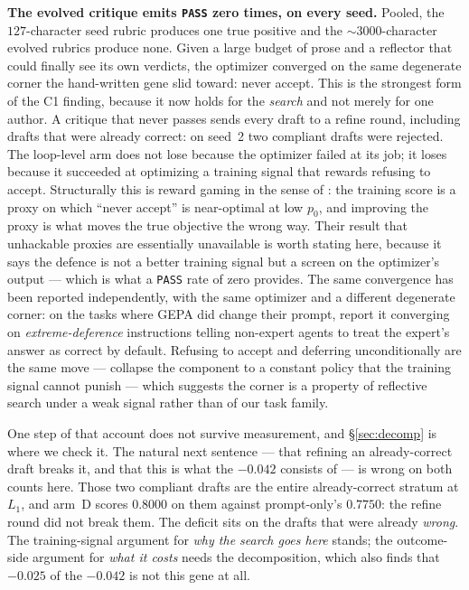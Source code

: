\documentclass[11pt]{article}
\begin{document}
\textbf{The evolved critique emits \texttt{PASS} zero times, on every seed.} Pooled, the
$127$-character seed rubric produces one true positive and the ${\sim}3000$-character evolved
rubrics produce none. Given a large budget of prose and a reflector that could finally see
its own verdicts, the optimizer converged on the same degenerate corner the hand-written gene
slid toward: never accept. This is the strongest form of the C1 finding, because it now holds
for the \emph{search} and not merely for one author. A critique that never passes sends every
draft to a refine round, including drafts that were already correct: on seed~2 two compliant
drafts were rejected. The loop-level arm does not lose because the optimizer failed at its
job; it loses because it succeeded at optimizing a training signal that rewards refusing to
accept. Structurally this is reward gaming in the sense of \citet{skalse2022reward}: the
training score is a proxy on which ``never accept'' is near-optimal at low $p_0$, and improving
the proxy is what moves the true objective the wrong way. Their result that unhackable proxies
are essentially unavailable is worth stating here, because it says the defence is not a better
training signal but a screen on the optimizer's output --- which is what a \texttt{PASS} rate of
zero provides. The same convergence has been reported independently, with the same optimizer and
a different degenerate corner: on the tasks where GEPA did change their prompt,
\citet{pappu2026multiagent} report it converging on \emph{extreme-deference} instructions telling
non-expert agents to treat the expert's answer as correct by default. Refusing to accept and
deferring unconditionally are the same move --- collapse the component to a constant policy that
the training signal cannot punish --- which suggests the corner is a property of reflective search
under a weak signal rather than of our task family.

One step of that account does not survive measurement, and \S\ref{sec:decomp} is where we
check it. The natural next sentence --- that refining an already-correct draft breaks it, and
that this is what the $-0.042$ consists of --- is wrong on both counts here. Those two
compliant drafts are the entire already-correct stratum at $L_1$, and arm~D scores $0.8000$ on
them against prompt-only's $0.7750$: the refine round did not break them. The deficit sits on
the drafts that were already \emph{wrong}. The training-signal argument for \emph{why the
search goes here} stands; the outcome-side argument for \emph{what it costs} needs the
decomposition, which also finds that $-0.025$ of the $-0.042$ is not this gene at all.
\end{document}
